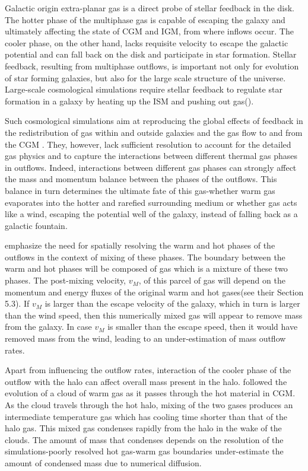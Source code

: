 \documentclass[twocolumn]{aastex62}
\begin{document}
Galactic origin extra-planar gas is a direct probe of stellar feedback in the disk. The hotter phase of the multiphase gas is capable of escaping the galaxy and ultimately affecting the state of CGM and IGM, from where inflows occur. The cooler phase, on the other hand, lacks requisite velocity to escape the galactic potential and can fall back on the disk and participate in star formation. Stellar feedback, resulting from multiphase outflows, is important not only for evolution of star forming galaxies, but also for the large scale structure of the universe. Large-scale cosmological simulations require stellar feedback to regulate star formation in a galaxy by heating up the ISM and pushing out gas(\citep{Scannapieco+09}).

Such cosmological simulations aim at reproducing the global effects of feedback in the redistribution of gas within and outside galaxies and the gas flow to and from the CGM \citep[e.g.,][]{Hopkins12,Schaye+15,Pillepich+18}. They, however, lack sufficient resolution to account for the detailed gas physics and to capture the interactions between different thermal gas phases in outflows. Indeed, interactions between different gas phases can strongly affect the mass and momentum balance between the phases of the outflows. This balance in turn determines the ultimate fate of this gas-whether warm gas evaporates into the hotter and rarefied surrounding medium or whether gas acts like a wind, escaping the potential well of the galaxy, instead of falling back as a galactic fountain.

\cite{Kim&Ostriker18} emphasize the need for spatially resolving the warm and hot phases of the outflows in the context of mixing of these phases. The boundary between the warm and hot phases will be composed of gas which is a mixture of these two phases. The post-mixing velocity, $v_M$, of this parcel of gas will depend on the momentum and energy fluxes of the original warm and hot gases(see their Section 5.3). If $v_M$ is larger than the escape velocity of the galaxy, which in turn is larger than the wind speed, then this numerically mixed gas will appear to remove mass from the galaxy. In case $v_M$ is smaller than the escape speed, then it would have removed mass from the wind, leading to an under-estimation of mass outflow rates. 

Apart from influencing the outflow rates, interaction of the cooler phase of the outflow with the halo can affect overall mass present in the halo. \cite{Armillotta+16} followed the evolution of a cloud of warm gas as it passes through the hot material in CGM. As the cloud travels through the hot halo, mixing of the two gases produces an intermediate temperature gas which has cooling time shorter than that of the halo gas. This mixed gas condenses rapidly from the halo in the wake of the clouds. The amount of mass that condenses depends on the resolution of the simulations-poorly resolved hot gas-warm gas boundaries under-estimate the amount of condensed mass due to numerical diffusion. 
\end{document}
